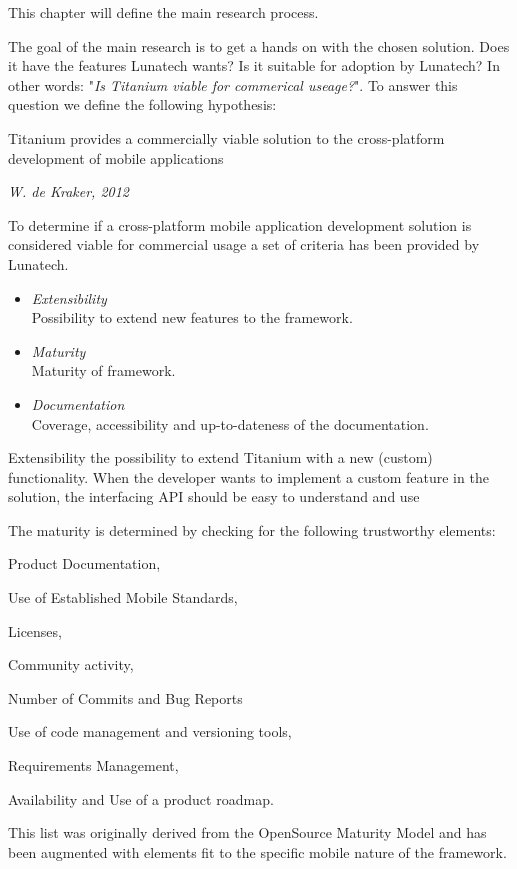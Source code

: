 This chapter will define the main research process. 

The goal of the main research is to get a hands on with the chosen solution. Does it have the features Lunatech wants? Is it suitable for adoption by Lunatech? In other words: "\emph{Is Titanium viable for commerical useage?}". To answer this question we define the following hypothesis:
\begin{shadequote}
Titanium provides a commercially viable solution to the cross-platform development of mobile applications\par\emph{W. de Kraker, 2012}
\end{shadequote}

To determine if a cross-platform mobile application development solution is considered viable for commercial usage a set of criteria has been provided by Lunatech.
\begin{itemize}
	\item \emph{Extensibility}\\
	Possibility to extend new features to the framework.
	\item \emph{Maturity}\\ 
	Maturity of framework.
	\item \emph{Documentation}\\
	Coverage, accessibility and up-to-dateness of the documentation.
\end{itemize}


Extensibility the possibility to extend Titanium with a new (custom) functionality. 
When the developer wants to implement a custom feature in the solution, the interfacing API should be easy to understand and use

The maturity is determined by checking for the following trustworthy elements: \begin{inparaenum}
\item Product Documentation,
\item Use of Established Mobile Standards,
\item Licenses,
\item Community activity,
\item Number of Commits and Bug Reports
\item Use of code management and versioning tools,
\item Requirements Management,
\item Availability and Use of a product roadmap.
\end{inparaenum}
This list was originally derived from the OpenSource Maturity Model\cite{Wikipedia2011} and has been augmented with elements fit to the specific mobile nature of the framework.


